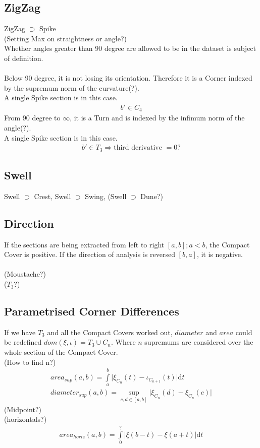\documentclass{report}
\begin{document}
\subsection{ZigZag}
ZigZag $\supset$ Spike\\
(Setting Max on straightness or angle?)\\
Whether angles greater than 90 degree are allowed to be in the dataset is subject of definition.\\\\
Below 90 degree, it is not losing its orientation. Therefore it is a Corner indexed by the supremum norm of the curvature(?).\\
A single Spike section is in this case.
\begin{align}
b' \in C_{4}
\end{align}
From 90 degree to $\infty$, it is a Turn and is indexed by the infimum norm of the angle(?).\\
A single Spike section is in this case.
\begin{align}
b' \in T_{3} \Rightarrow \text{third derivative }= 0\text{?}
\end{align}
\subsection{Swell}
Swell $\supset$ Crest, Swell $\supset$ Swing, (Swell $\supset$ Dune?)
\subsection*{Direction}
If the sections are being extracted from left to right $[a,b];a<b$, the Compact Cover is positive. If the direction of analysis is reversed $[b,a]$, it is negative.\\\\
(Moustache?)\\
($T_{3}$?)

\subsection*{Parametrised Corner Differences}
If we have $T_{3}$ and all the Compact Covers worked out, $diameter$ and $area$ could be redefined $dom(\xi,\iota)=T_{3}\cup C_{n}$. Where $n$ supremums are considered over the whole section of the Compact Cover.\\
(How to find n?)
\begin{align}
area_{sup}(a,b)=\int \limits _{a}^{b} \lvert \xi_{C_{n}}(t)-\iota_{C_{n+1}}(t) \rvert \mathrm{d}t\\
diameter_{sup}(a,b)=\sup \limits _{c,d \in [a,b]} \lvert \xi_{C_{n}}(d) - \xi_{C_{n}}(c) \rvert
\end{align}
(Midpoint?)\\
(horizontals?)
\begin{align}
area_{horiz}(a,b)=\int \limits _{0}^{?} \lvert \xi(b-t)-\xi(a+t) \rvert \mathrm{d}t
\end{align}
\end{document}
